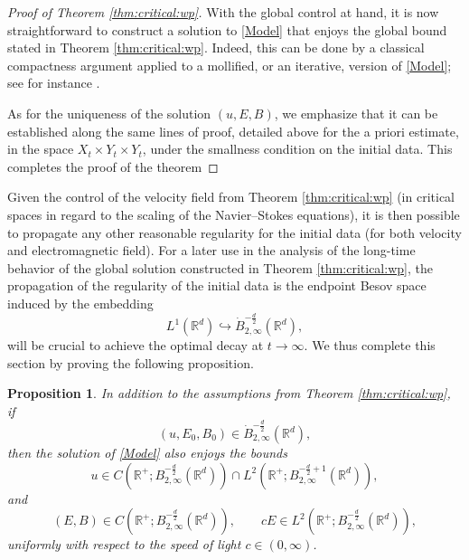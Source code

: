 \documentclass[11pt, leqno, a4paper,]{amsart}
\newtheorem{proposition}[theorem]{Proposition}
\theoremstyle{remark}
\numberwithin{equation}{section}
\begin{document}
\begin{proof}[Proof of Theorem \ref{thm:critical:wp}]
With the global control at hand, it is now straightforward to construct a solution to \eqref{Model} that enjoys the global bound stated in Theorem \ref{thm:critical:wp}. Indeed, this can be done by a classical compactness argument applied to a mollified,  or an iterative, version of \eqref{Model}; see for instance \cite{ag20, ahh24, GIM14}.

As for the uniqueness of the solution $(u,E,B)$, we emphasize  that it can be established along the same lines of proof, detailed above for the a priori estimate, in the space $X_t \times Y_t \times  Y_t$, under the smallness condition on the initial data. This completes the proof of the theorem
\end{proof}  


Given the control of the velocity field from Theorem  \ref{thm:critical:wp} (in critical spaces in regard to the scaling of the Navier--Stokes equations), it is then possible to propagate any other reasonable regularity for the initial data (for both velocity and electromagnetic field). For a later use in the analysis of the long-time behavior of the global solution constructed in Theorem \ref{thm:critical:wp}, the propagation of the regularity of the initial data is the endpoint Besov space induced by the embedding 
\begin{equation*}
	L^1(\mathbb R^d) \hookrightarrow \dot B^{-\frac{d}{2}}_{2,\infty} (\mathbb R^d),
\end{equation*}
will be crucial to achieve the optimal decay at $t\to \infty$. We thus complete this section by proving the following proposition.
\begin{proposition}\label{Prop_negative_regularity}
	In addition to the assumptions from Theorem \ref{thm:critical:wp}, if 
\begin{equation*}
 (u,E_0,B_0)\in \dot B^{-\frac{d}{2}}_{2,\infty} (\mathbb R^d),
	\end{equation*}
	then the solution of \eqref{Model} also enjoys the bounds 
	\begin{equation*}
		u\in C (\mathbb R^+; B^{-\frac{d}{2}}_{2,\infty}  (\mathbb R^d)) \cap L^2 (\mathbb R^+; B^{-\frac{d}{2}+1}_{2,\infty}   (\mathbb R^d)),
	\end{equation*}
	and 
	\begin{equation*}
		(E,B) \in C (\mathbb R^+; B^{-\frac{d}{2}}_{2,\infty}   (\mathbb R^d)),  \qquad 
  cE \in L^2 (\mathbb R^+; B^{-\frac{d}{2}}_{2,\infty}   (\mathbb R^d)),
	\end{equation*}
	 uniformly with respect to the speed of light $c\in (0,\infty)$.
\end{proposition}
\end{document}
